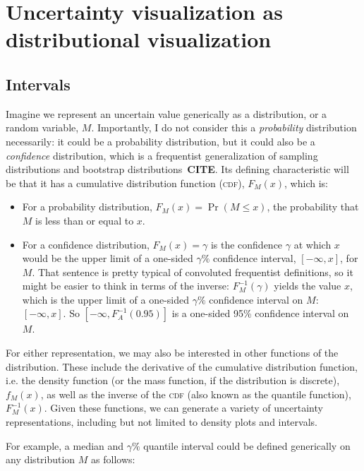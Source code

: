 \documentclass[journal]{vgtc}                     %
\begin{document}
\section{Uncertainty visualization as distributional visualization}

\subsection{Intervals}

Imagine we represent an uncertain value generically as a distribution, or a random variable, $M$. Importantly, I do not consider this a \textit{probability} distribution necessarily: it could be a probability distribution, but it could also be a \textit{confidence} distribution, which is a frequentist generalization of sampling distributions and bootstrap distributions~\textbf{CITE}. Its defining characteristic will be that it has a cumulative distribution function (\textsc{cdf}), $F_M(x)$, which is:
\begin{itemize}
    \item For a probability distribution, $F_M(x) = \Pr(M \le x)$, the probability that $M$ is less than or equal to $x$.
    \item   For a confidence distribution, $F_M(x) = \gamma$  is the confidence $\gamma$ at which $x$ would be the upper limit of a one-sided $\gamma\%$ confidence interval, $[-\infty, x]$, for $M$. That sentence is pretty typical of convoluted frequentist definitions, so it might be easier to think in terms of the inverse: $F_M^{-1}(\gamma)$ yields the value $x$, which is the upper limit of a one-sided $\gamma\%$ confidence interval on $M$: $[-\infty,x]$. So $[-\infty, F_A^{-1}(0.95)]$ is a one-sided 95\% confidence interval on $M$.
\end{itemize}

For either representation, we may also be interested in other functions of the distribution. These include the derivative of the cumulative distribution function, i.e. the density function (or the mass function, if the distribution is discrete), $f_M(x)$, as well as the inverse of the \textsc{cdf} (also known as the quantile function), $F_M^{-1}(x)$. Given these functions, we can generate a variety of uncertainty representations, including but not limited to density plots and intervals.

For example, a median and $\gamma\%$ quantile interval could be defined generically on any distribution $M$ as follows:
\end{document}
